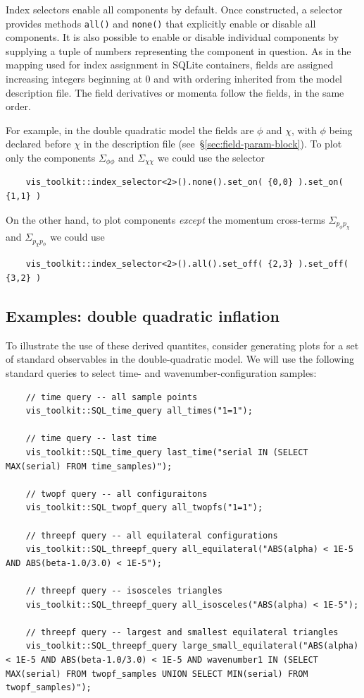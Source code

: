 \documentclass[11pt,a4paper]{article}
\newcommand{\packagefont}{\sffamily}
\newcommand{\SQLite}{{\packagefont SQLite}}
\begin{document}
Index selectors enable all components by default.
Once constructed, a selector provides methods
\texttt{all()}
and
\texttt{none()}
that explicitly enable or disable all components.
It is also possible to enable or disable individual
components by supplying a tuple of numbers representing
the component in question.
As in the mapping used for index assignment in {\SQLite} containers,
fields are assigned increasing integers beginning at 0
and with ordering inherited from the model description file.
The field derivatives or momenta
follow the fields, in the same order.

For example, in the double quadratic model the fields are
$\phi$ and $\chi$, with $\phi$ being declared before $\chi$
in the description file (see~\S\ref{sec:field-param-block}).
To plot only the components $\Sigma_{\phi\phi}$ and
$\Sigma_{\chi\chi}$ we could use the selector
\begin{verbatim}    
    vis_toolkit::index_selector<2>().none().set_on( {0,0} ).set_on( {1,1} )
\end{verbatim}
On the other hand, to plot components \emph{except} the
momentum cross-terms
$\Sigma_{p_\phi p_\chi}$
and
$\Sigma_{p_\chi p_\phi}$
we could use
\begin{verbatim}
    vis_toolkit::index_selector<2>().all().set_off( {2,3} ).set_off( {3,2} )    
\end{verbatim}

\subsection{Examples: double quadratic inflation}
To illustrate the use of these derived quantites, consider generating
plots for a set of standard observables in the double-quadratic model.
We will use the following standard queries to select time- and wavenumber-configuration
samples:
\begin{verbatim}
    // time query -- all sample points
    vis_toolkit::SQL_time_query all_times("1=1");

    // time query -- last time
    vis_toolkit::SQL_time_query last_time("serial IN (SELECT MAX(serial) FROM time_samples)");

    // twopf query -- all configuraitons
    vis_toolkit::SQL_twopf_query all_twopfs("1=1");

    // threepf query -- all equilateral configurations
    vis_toolkit::SQL_threepf_query all_equilateral("ABS(alpha) < 1E-5 AND ABS(beta-1.0/3.0) < 1E-5");

    // threepf query -- isosceles triangles
    vis_toolkit::SQL_threepf_query all_isosceles("ABS(alpha) < 1E-5");

    // threepf query -- largest and smallest equilateral triangles
    vis_toolkit::SQL_threepf_query large_small_equilateral("ABS(alpha) < 1E-5 AND ABS(beta-1.0/3.0) < 1E-5 AND wavenumber1 IN (SELECT MAX(serial) FROM twopf_samples UNION SELECT MIN(serial) FROM twopf_samples)");
\end{verbatim}
\end{document}
